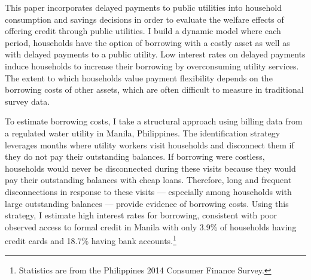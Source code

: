 \documentclass[12pt,table]{article}
\begin{document}
This paper incorporates delayed payments to public utilities into household consumption and savings decisions in order to evaluate the welfare effects of offering credit through public utilities.  I build a dynamic model where each period, households have the option of borrowing with a costly asset as well as with delayed payments to a public utility.  Low interest rates on delayed payments induce households to increase their borrowing by overconsuming utility services.  The extent to which households value payment flexibility depends on the borrowing costs of other assets, which are often difficult to measure in traditional survey data. 

To estimate borrowing costs, I take a structural approach using billing data from a regulated water utility in Manila, Philippines.  The identification strategy leverages months where utility workers visit households and disconnect them if they do not pay their outstanding balances.  If borrowing were costless, households would never be disconnected during these visits because they would pay their outstanding balances with cheap loans.  Therefore, long and frequent disconnections in response to these visits --- especially among households with large outstanding balances --- provide evidence of borrowing costs.   Using this strategy, I estimate high interest rates for borrowing, consistent with poor observed access to formal credit in Manila with only 3.9\% of households having credit cards and 18.7\% having bank accounts.\footnote{Statistics are from the Philippines 2014 Consumer Finance Survey.}  
\end{document}

